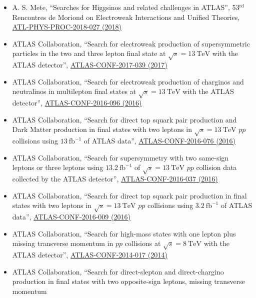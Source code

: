 \documentclass[a4paper,10pt]{article}
\begin{document}
\begin{itemize}
	\item A. S. Mete,
	``Searches for Higgsinos and related challenges in ATLAS'',
	53$^{\mathrm{rd}}$ Rencontres de Moriond on Electroweak Interactions and Unified Theories,
	\href{https://cds.cern.ch/record/1478973}{ATL-PHYS-PROC-2018-027 (2018)}
	\item ATLAS Collaboration,
	``Search for electroweak production of supersymmetric particles in the two and three lepton final state at $\sqrt{s}=13\ \mathrm{TeV}$ with the ATLAS detector'',
	\href{https://atlas.web.cern.ch/Atlas/GROUPS/PHYSICS/CONFNOTES/ATLAS-CONF-2017-039/}{ATLAS-CONF-2017-039 (2017)}
	\item ATLAS Collaboration,
	``Search for electroweak production of charginos and neutralinos in multilepton final states at $\sqrt{s}=13\ \mathrm{TeV}$ with the ATLAS detector'',
	\href{https://atlas.web.cern.ch/Atlas/GROUPS/PHYSICS/CONFNOTES/ATLAS-CONF-2016-096/}{ATLAS-CONF-2016-096 (2016)}
	\item ATLAS Collaboration, 
	``Search for direct top squark pair production and Dark Matter production in final states with two leptons in $\sqrt{s}=13\ \mathrm{TeV}$ $pp$ collisions using $13\ \mathrm{fb}^{-1}$ of ATLAS data'',
	\href{https://atlas.web.cern.ch/Atlas/GROUPS/PHYSICS/CONFNOTES/ATLAS-CONF-2016-076/}{ATLAS-CONF-2016-076 (2016)}
	\item ATLAS Collaboration,
	``Search for supersymmetry with two same-sign leptons or three leptons using $13.2\ \mathrm{fb}^{-1}$ of $\sqrt{s}=13\ \mathrm{TeV}$ $pp$ collision data collected by the ATLAS detector'',
	\href{https://atlas.web.cern.ch/Atlas/GROUPS/PHYSICS/CONFNOTES/ATLAS-CONF-2016-037/}{ATLAS-CONF-2016-037 (2016)} 
	\item ATLAS Collaboration, 
	``Search for direct top squark pair production in final states with two leptons in $\sqrt{s}=13\ \mathrm{TeV}$ $pp$ collisions using $3.2\ \mathrm{fb}^{-1}$ of ATLAS data'',
	\href{https://atlas.web.cern.ch/Atlas/GROUPS/PHYSICS/CONFNOTES/ATLAS-CONF-2016-009/}{ATLAS-CONF-2016-009 (2016)} 	
	\item ATLAS Collaboration, 
	``Search for high-mass states with one lepton plus missing transverse momentum in $pp$ collisions at $\sqrt{s}= 8\ \mathrm{TeV}$ with the ATLAS detector'',
	\href{https://atlas.web.cern.ch/Atlas/GROUPS/PHYSICS/CONFNOTES/ATLAS-CONF-2014-017/}{ATLAS-CONF-2014-017 (2014)} 
	\item ATLAS Collaboration, 
	``Search for direct-slepton and direct-chargino production in final states with two opposite-sign leptons, missing transverse momentum 

\end{itemize}
\end{document}
